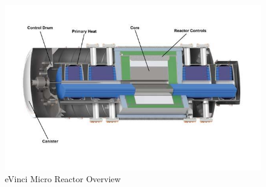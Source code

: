 \begin{figure}[hbtp]
\centering
\includegraphics[scale=0.5]{Figs/evinciover.jpeg}
\caption{eVinci Micro Reactor Overview}
\label{eVincioverview}
\end{figure}

\pagebreak
